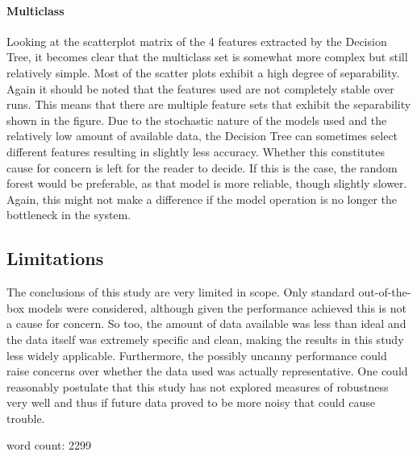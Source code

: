 \documentclass[british]{article}
\begin{document}
	\paragraph{Multiclass} Looking at the scatterplot matrix of the 4 features extracted by the Decision Tree, it becomes clear that the multiclass set is somewhat more complex but still relatively simple. Most of the scatter plots exhibit a high degree of separability. Again it should be noted that the features used are not completely stable over runs. This means that there are multiple feature sets that exhibit the separability shown in the figure. Due to the stochastic nature of the models used and the relatively low amount of available data, the Decision Tree can sometimes select different features resulting in slightly less accuracy. Whether this constitutes cause for concern is left for the reader to decide. If this is the case, the random forest would be preferable, as that model is more reliable, though slightly slower. Again, this might not make a difference if the model operation is no longer the bottleneck in the system.     
	
	\subsection{Limitations}
	The conclusions of this study are very limited in scope. Only standard out-of-the-box models were considered, although given the performance achieved this is not a cause for concern. So too, the amount of data available was less than ideal and the data itself was extremely specific and clean, making the results in this study less widely applicable. Furthermore, the possibly uncanny performance could raise concerns over whether the data used was actually representative. One could reasonably postulate that this study has not explored measures of robustness very well and thus if future data proved to be more noisy that could cause trouble.
	
	
	word count:  2299
	\FloatBarrier
	\printbibliography
\end{document}
